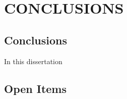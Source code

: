 %
%
%
\chapter{\uppercase {Conclusions}}
\label{sec::Conclusions}


\section{Conclusions}
\label{sec::Conclusions_Conclusions}

In this dissertation

\section{Open Items}
\label{sec::Conclusions_Open_Items}